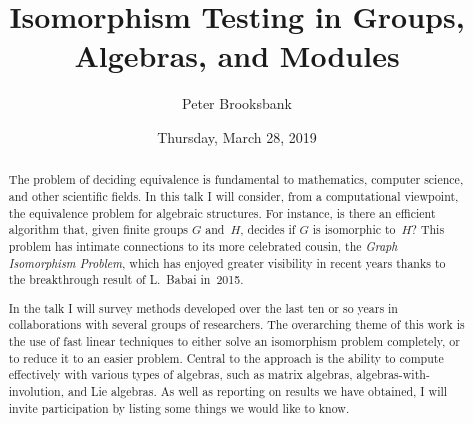 \documentclass{UAmathtalk}
\author{Peter Brooksbank}
\title{Isomorphism Testing in Groups, Algebras, and Modules}
\date{Thursday, March 28, 2019}
\begin{document}
\maketitle

\begin{abstract}
The problem of deciding equivalence is fundamental to mathematics, computer science, and other scientific fields. In this talk I will consider, from a computational viewpoint,  the equivalence problem for algebraic structures. For instance, is there an efficient algorithm that, given finite groups $G$ and~$H$, decides if $G$ is isomorphic to~$H$? This problem has intimate connections to its more celebrated cousin, the \emph{Graph Isomorphism Problem}, which has enjoyed greater visibility in recent years thanks to the breakthrough result of L.~Babai in~2015.

In the talk I will survey methods developed over the last ten or so years in collaborations with several groups of researchers. The overarching theme of this work is the use of fast linear techniques to either solve an isomorphism problem completely, or to reduce it to an easier problem. Central to the approach is the ability to compute effectively with various types of algebras, such as matrix algebras, algebras-with-involution, and Lie algebras. As well as reporting on results we have obtained, I will invite participation by listing some things we would like to know.
\end{abstract}
\end{document}
